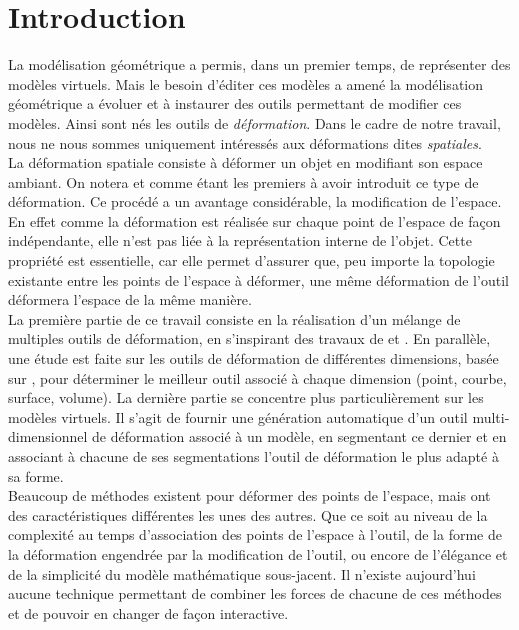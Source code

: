 \chapter{Introduction}

\graphicspath{ {Introduction/IntroductionFigs/PNG/}
  {Introduction/IntroductionFigs/PDF/}
  {Introduction/IntroductionFigs/} }

La modélisation géométrique a permis, dans un premier temps, de
représenter des modèles virtuels. Mais le besoin d'éditer ces modèles
a amené la modélisation géométrique a évoluer et à instaurer des
outils permettant de modifier ces modèles. Ainsi sont nés les outils
de \textit{déformation}. Dans le cadre de notre travail, nous ne nous
sommes uniquement intéressés aux déformations dites
\textit{spatiales}.
\\

La déformation spatiale consiste à déformer un objet en modifiant son
espace ambiant.  On notera \cite{Bar84} et \cite{SP86} comme étant les
premiers à avoir introduit ce type de déformation. Ce procédé a un
avantage considérable, la modification de l'espace. En effet comme la
déformation est réalisée sur chaque point de l'espace de façon
indépendante, elle n'est pas liée à la représentation interne de
l'objet. Cette propriété est essentielle, car elle permet d'assurer
que, peu importe la topologie existante entre les points de l'espace à
déformer, une même déformation de l'outil déformera l'espace de la
même manière.
\\

La première partie de ce travail consiste en la réalisation d'un
mélange de multiples outils de déformation, en s'inspirant des travaux
de \cite{JBPS11} et \cite{GPCP13}. En parallèle, une étude est faite
sur les outils de déformation de différentes dimensions, basée sur
\cite{GB08}, pour déterminer le meilleur outil associé à chaque
dimension (point, courbe, surface, volume). La dernière partie se
concentre plus particulièrement sur les modèles virtuels. Il s'agit de
fournir une génération automatique d'un outil multi-dimensionnel de
déformation associé à un modèle, en segmentant ce dernier et en
associant à chacune de ses segmentations l'outil de déformation le
plus adapté à sa forme.
\\

Beaucoup de méthodes existent pour déformer des points de l'espace,
mais ont des caractéristiques différentes les unes des autres. Que ce
soit au niveau de la complexité au temps d'association des points de
l'espace à l'outil, de la forme de la déformation engendrée par la
modification de l'outil, ou encore de l'élégance et de la simplicité
du modèle mathématique sous-jacent. Il n'existe aujourd'hui aucune
technique permettant de combiner les forces de chacune de ces méthodes
et de pouvoir en changer de façon interactive.
\\

